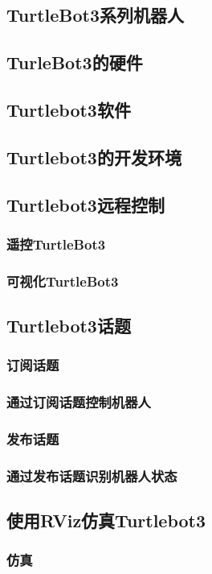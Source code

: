 \documentclass[geye,green,kindle,cn]{elegantnote}
\begin{document}
\subsection{TurtleBot3系列机器人}
\subsection{TurleBot3的硬件}
\subsection{Turtlebot3软件}
\subsection{Turtlebot3的开发环境}
\subsection{Turtlebot3远程控制}
\subsubsection{遥控TurtleBot3}
\subsubsection{可视化TurtleBot3}
\subsection{Turtlebot3话题}
\subsubsection{订阅话题}
\subsubsection{通过订阅话题控制机器人}
\subsubsection{发布话题}
\subsubsection{通过发布话题识别机器人状态}
\subsection{使用RViz仿真Turtlebot3}
\subsubsection{仿真}
\end{document}
